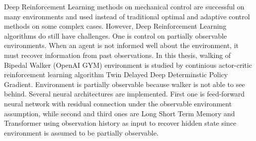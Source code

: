 Deep Reinforcement Learning methods on mechanical control are successful on many environments and used instead of traditional optimal and adaptive control methods on some complex cases. However, Deep Reinforcement Learning algorithms do still have challenges. One is control on partially observable environments. When an agent is not informed well about the environment, it must recover information from past observations. In this thesis, walking of Bipedal Walker (OpenAI GYM) environment is studied by continious actor-critic reinforcement learning algorithm Twin Delayed Deep Determinstic Policy Gradient. Environment is partially observable because walker is not able to see behind. Several neural architectures are implemented. First one is feed-forward neural network with residual connection under the observable environment assumption, while second and third ones are Long Short Term Memory and Transformer using observation history as input to recover hidden state since environment is assumed to be partially observable.



